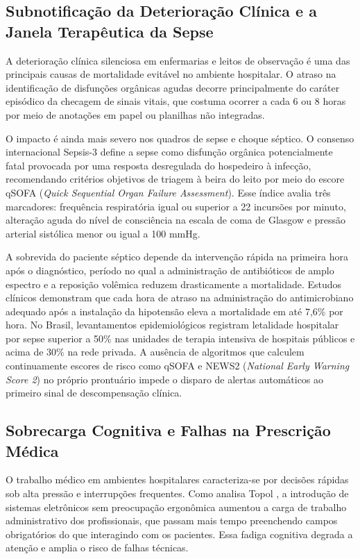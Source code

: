 \subsection{Subnotificação da Deterioração Clínica e a Janela Terapêutica da Sepse}

A deterioração clínica silenciosa em enfermarias e leitos de observação é uma das principais causas de mortalidade evitável no ambiente hospitalar. O atraso na identificação de disfunções orgânicas agudas decorre principalmente do caráter episódico da checagem de sinais vitais, que costuma ocorrer a cada 6 ou 8 horas por meio de anotações em papel ou planilhas não integradas.

O impacto é ainda mais severo nos quadros de sepse e choque séptico. O consenso internacional Sepsis-3 \cite{singer_sepsis:2016} define a sepse como disfunção orgânica potencialmente fatal provocada por uma resposta desregulada do hospedeiro à infecção, recomendando critérios objetivos de triagem à beira do leito por meio do escore qSOFA (\textit{Quick Sequential Organ Failure Assessment}). Esse índice avalia três marcadores: frequência respiratória igual ou superior a 22 incursões por minuto, alteração aguda do nível de consciência na escala de coma de Glasgow e pressão arterial sistólica menor ou igual a 100 mmHg.

A sobrevida do paciente séptico depende da intervenção rápida na primeira hora após o diagnóstico, período no qual a administração de antibióticos de amplo espectro e a reposição volêmica reduzem drasticamente a mortalidade. Estudos clínicos demonstram que cada hora de atraso na administração do antimicrobiano adequado após a instalação da hipotensão eleva a mortalidade em até 7,6\% por hora. No Brasil, levantamentos epidemiológicos registram letalidade hospitalar por sepse superior a 50\% nas unidades de terapia intensiva de hospitais públicos e acima de 30\% na rede privada. A ausência de algoritmos que calculem continuamente escores de risco como qSOFA e NEWS2 (\textit{National Early Warning Score 2}) no próprio prontuário impede o disparo de alertas automáticos ao primeiro sinal de descompensação clínica.

\subsection{Sobrecarga Cognitiva e Falhas na Prescrição Médica}

O trabalho médico em ambientes hospitalares caracteriza-se por decisões rápidas sob alta pressão e interrupções frequentes. Como analisa Topol \cite{topol:2019}, a introdução de sistemas eletrônicos sem preocupação ergonômica aumentou a carga de trabalho administrativo dos profissionais, que passam mais tempo preenchendo campos obrigatórios do que interagindo com os pacientes. Essa fadiga cognitiva degrada a atenção e amplia o risco de falhas técnicas.

